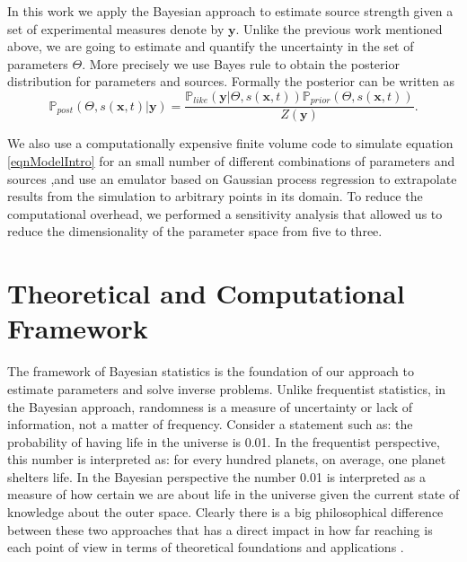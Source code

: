 \documentclass[12pt]{book}
\newcommand{\post}{\mathbb{P}_{post}}
\newcommand{\like}{\mathbb{P}_{like}}
\newcommand{\prior}{\mathbb{P}_{prior}}
\newcommand{\x}{\textbf{x}}
\newcommand{\y}{\textbf{y}}
\begin{document}
In this work we apply the Bayesian approach to estimate source strength
given a set of experimental measures denote by $\y$. Unlike
the previous work mentioned above, we are going to estimate and
quantify the uncertainty in the set of parameters $\Theta$.  More precisely
we use Bayes rule to obtain the posterior distribution for parameters
and sources. Formally the posterior can be written as
\begin{equation*}
\post(\Theta,s(\x,t)|\y)=\frac{\like(\y|\Theta,s(\x,t))\prior(\Theta,s(\x,t))}{Z(\y)}.
\end{equation*}



We also use a computationally expensive finite volume code to simulate
equation \eqref{eqnModelIntro}  for an small  number of different
combinations of parameters and sources ,and use an emulator based
on Gaussian process regression to extrapolate results
from the simulation to arbitrary points in its domain. To 
reduce the computational overhead, we performed
a sensitivity analysis that allowed us to reduce the dimensionality
of the parameter space from five to three. 











\newpage

\chapter{Theoretical and Computational Framework}


The framework of Bayesian statistics is the foundation of  our approach to estimate parameters and solve 
inverse problems. Unlike frequentist statistics, in the Bayesian approach, randomness
is a measure of uncertainty or lack of information,  not a matter of frequency. Consider a statement such  as:
the probability of having life in the universe is 0.01. In the frequentist
perspective, this number is interpreted as: for every hundred planets, on average, one planet shelters life.
 In the Bayesian
perspective the number 0.01 is interpreted as a measure of how certain we are about life in the universe
given the current state of knowledge about the outer space. 
Clearly there is a big philosophical
difference between these two approaches that has a direct impact in how far reaching is each point of view 
in terms of theoretical foundations and applications  \cite{jaynes2003probability}.
\end{document}
